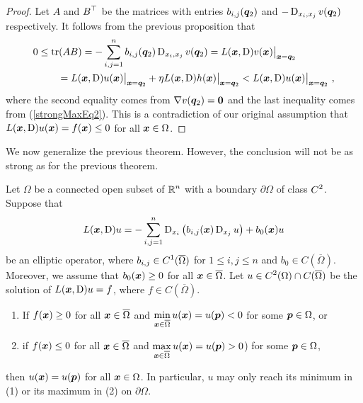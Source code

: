 \begin{proof}
Let $A$ and $\displaystyle B^\top$ be the matrices with entries
$b_{i,j}({\bm{q}}_2)$ and $-\operatorname{D}_{x_i,x_j} v({\bm{q}}_2)$ respectively.
It follows from the previous proposition that
\begin{align*}
0 &\leq \operatorname{tr}(AB)
= - \sum_{i,j=1}^n b_{i,j}({\bm{q}}_2) \operatorname{D}_{x_i,x_j} v({\bm{q}}_2)
= L({\bm{x}},\operatorname{D}) v({\bm{x}})\big|_{{\bm{x}} = {\bm{q}}_2} \\
&\qquad = L({\bm{x}},\operatorname{D}) u({\bm{x}})\big|_{{\bm{x}} = {\bm{q}}_2}
+ \eta L({\bm{x}},\operatorname{D}) h({\bm{x}})\big|_{{\bm{x}} = {\bm{q}}_2}
< L({\bm{x}},\operatorname{D}) u({\bm{x}})\big|_{{\bm{x}} = {\bm{q}}_2} \ ,
\end{align*}
where the second equality comes from $\nabla v({\bm{q}}_2) = {\bm{0}}$
and the last inequality comes from (\ref{strongMaxEq2}).  This is a
contradiction of our original assumption that
$L({\bm{x}},\operatorname{D}) u({\bm{x}}) = f({\bm{x}}) \leq 0$ for all ${\bm{x}} \in \Omega$.
\end{proof}


We now generalize the previous theorem.  However, the conclusion will
not be as strong as for the previous theorem.

\begin{theorem} \label{ellStrongMaxB}
Let $\Omega$ be a connected open subset of $\displaystyle \mathbb{R}^n$ with
a boundary $\partial \Omega$ of class $\displaystyle C^2$.  Suppose that
\[
L({\bm{x}},\operatorname{D})u = - \sum_{i,j=1}^n
\operatorname{D}_{x_i} \left( b_{i,j}({\bm{x}}) \operatorname{D}_{x_j} u \right) + b_0({\bm{x}}) u
\]
be an elliptic operator, where
$\displaystyle b_{i,j} \in C^1(\overline{\Omega})$
for $1 \leq i,j\leq n$ and $b_0 \in C(\overline{\Omega})$.
Moreover, we assume that $b_0({\bm{x}}) \geq 0$ for all
${\bm{x}} \in \overline{\Omega}$.
Let $\displaystyle u \in C^2(\Omega) \cap C(\overline{\Omega})$ be the
solution of $L({\bm{x}},\operatorname{D})u = f$, where $f \in C(\overline{\Omega})$.
\begin{enumerate}
\item If $f({\bm{x}}) \geq 0$ for all ${\bm{x}} \in \overline{\Omega}$ and
$\displaystyle \min_{{\bm{x}}\in \overline{\Omega}} u({\bm{x}}) = u({\bm{p}}) < 0$
for some ${\bm{p}} \in \Omega$, or
\item if $f({\bm{x}}) \leq 0$ for all ${\bm{x}} \in \overline{\Omega}$ and
$\displaystyle \max_{{\bm{x}}\in \overline{\Omega}} u({\bm{x}}) = u({\bm{p}}) > 0$)
for some ${\bm{p}} \in \Omega$,
\end{enumerate}
then $u({\bm{x}})= u({\bm{p}})$ for all ${\bm{x}} \in \Omega$.  In
particular, $u$ may only reach its minimum in (1) or its maximum in
(2) on $\partial \Omega$.
\end{theorem}

